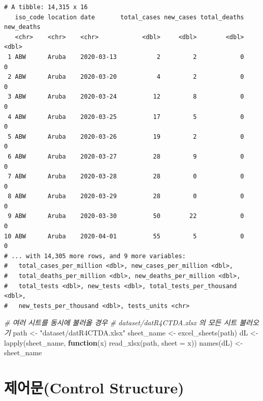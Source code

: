\documentclass[
  11pt,
]{krantz}
\newenvironment{Shaded}{\begin{snugshade}}{\end{snugshade}}
\newcommand{\AttributeTok}[1]{\textcolor[rgb]{0.61,0.61,0.61}{#1}}
\newcommand{\CommentTok}[1]{\textcolor[rgb]{0.37,0.37,0.37}{\textit{#1}}}
\newcommand{\ControlFlowTok}[1]{\textcolor[rgb]{0.27,0.27,0.27}{\textbf{#1}}}
\newcommand{\FunctionTok}[1]{\textcolor[rgb]{0,0,0}{#1}}
\newcommand{\NormalTok}[1]{#1}
\newcommand{\OtherTok}[1]{\textcolor[rgb]{0.37,0.37,0.37}{#1}}
\newcommand{\StringTok}[1]{\textcolor[rgb]{0.5,0.5,0.5}{#1}}
\begin{document}
\begin{verbatim}
# A tibble: 14,315 x 16
   iso_code location date       total_cases new_cases total_deaths new_deaths
   <chr>    <chr>    <chr>            <dbl>     <dbl>        <dbl>      <dbl>
 1 ABW      Aruba    2020-03-13           2         2            0          0
 2 ABW      Aruba    2020-03-20           4         2            0          0
 3 ABW      Aruba    2020-03-24          12         8            0          0
 4 ABW      Aruba    2020-03-25          17         5            0          0
 5 ABW      Aruba    2020-03-26          19         2            0          0
 6 ABW      Aruba    2020-03-27          28         9            0          0
 7 ABW      Aruba    2020-03-28          28         0            0          0
 8 ABW      Aruba    2020-03-29          28         0            0          0
 9 ABW      Aruba    2020-03-30          50        22            0          0
10 ABW      Aruba    2020-04-01          55         5            0          0
# ... with 14,305 more rows, and 9 more variables:
#   total_cases_per_million <dbl>, new_cases_per_million <dbl>,
#   total_deaths_per_million <dbl>, new_deaths_per_million <dbl>,
#   total_tests <dbl>, new_tests <dbl>, total_tests_per_thousand <dbl>,
#   new_tests_per_thousand <dbl>, tests_units <chr>
\end{verbatim}

\begin{Shaded}
\begin{Highlighting}[]
\CommentTok{\# 여러 시트를 동시에 불러올 경우}
\CommentTok{\# dataset/datR4CTDA.xlsx 의 모든 시트 불러오기}
\NormalTok{path }\OtherTok{\textless{}{-}} \StringTok{"dataset/datR4CTDA.xlsx"}
\NormalTok{sheet\_name }\OtherTok{\textless{}{-}} \FunctionTok{excel\_sheets}\NormalTok{(path)}
\NormalTok{dL }\OtherTok{\textless{}{-}} \FunctionTok{lapply}\NormalTok{(sheet\_name, }\ControlFlowTok{function}\NormalTok{(x) }\FunctionTok{read\_xlsx}\NormalTok{(path, }\AttributeTok{sheet =}\NormalTok{ x))}
\FunctionTok{names}\NormalTok{(dL) }\OtherTok{\textless{}{-}}\NormalTok{ sheet\_name}
\end{Highlighting}
\end{Shaded}

\normalsize

\mainmatter

\hypertarget{control-structure}{%
\chapter{제어문(Control Structure)}\label{control-structure}}
\end{document}
